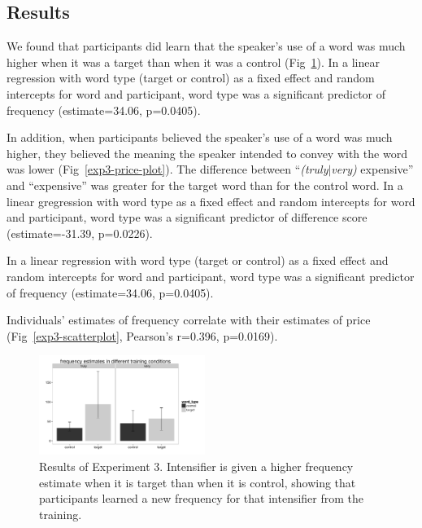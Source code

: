 \documentclass[10pt,letterpaper]{article}
\begin{document}
\subsection{Results}

We found that participants did learn that the speaker's use of a word was much higher when it was a target than when it was a control (Fig~\ref{exp3-freq-plot}). In a linear regression with word type (target or control) as a fixed effect and random intercepts for word and participant, word type was a significant predictor of frequency (estimate=34.06, p=0.0405).

In addition, when participants believed the speaker's use of a word was much higher, they believed the meaning the speaker intended to convey with the word was lower (Fig~\ref{exp3-price-plot}). The difference between ``\emph{(truly$|$very)} expensive'' and ``expensive'' was greater for the target word than for the control word. In a linear gregression with word type as a fixed effect and random intercepts for word and participant, word type was a significant predictor of difference score (estimate=-31.39, p=0.0226).

In a linear regression with word type (target or control) as a fixed effect and random intercepts for word and participant, word type was a significant predictor of frequency (estimate=34.06, p=0.0405).

Individuals' estimates of frequency correlate with their estimates of price (Fig~\ref{exp3-scatterplot}, Pearson's r=0.396, p=0.0169).

\begin{figure}[ht]
\begin{center}
\includegraphics[width=0.48\textwidth]{analysis_files_for_writeup/images/exp3-freq-plot}
\end{center}
\caption{Results of Experiment 3. Intensifier is given a higher frequency estimate when it is target than when it is control, showing that participants learned a new frequency for that intensifier from the training.} 
\label{exp3-freq-plot}
\end{figure}
\end{document}
